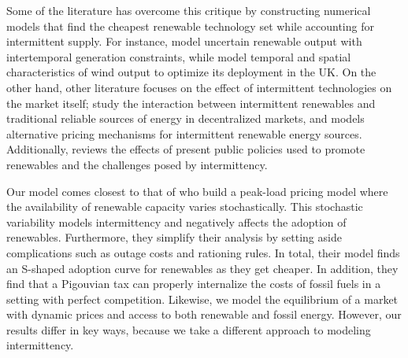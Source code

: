 \documentclass[11pt,a4paper]{extarticle}
\begin{document}
Some of the literature has overcome this critique by constructing numerical models that find the cheapest renewable technology set while accounting for intermittent supply. For instance, \citet{MN2006} model uncertain renewable output with intertemporal generation constraints, while \citet{NCK2007} model temporal and spatial characteristics of wind output to optimize its deployment in the UK. On the other hand, other literature focuses on the effect of intermittent technologies on the market itself; \citet{AC2012} study the interaction between intermittent renewables and traditional reliable sources of energy in decentralized markets, and \citet{Chao2011} models alternative pricing mechanisms for intermittent renewable energy sources. Additionally, \citet{Boren2012} reviews the effects of present public policies used to promote renewables and the challenges posed by intermittency. 

Our model comes closest to that of \citet{HH} who build a peak-load pricing model where the availability of renewable capacity varies stochastically. This stochastic variability models intermittency and negatively affects the adoption of renewables. Furthermore, they simplify their analysis by setting aside complications such as  outage costs and rationing rules. In total, their model finds an S-shaped adoption curve for renewables as they get cheaper. In addition, they find that a Pigouvian tax can properly internalize the costs of fossil fuels in a setting with perfect competition. Likewise, we model the  equilibrium of a market with dynamic prices and access to both renewable and fossil energy. However, our results differ in key ways, because we take a different approach to modeling intermittency. 
\end{document}

